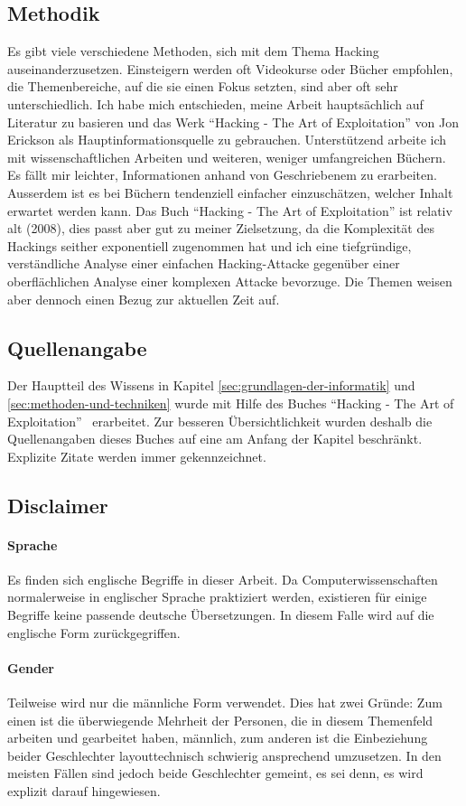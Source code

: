 \documentclass[11pt, a4paper]{article}
\begin{document}
\subsection{Methodik}
Es gibt viele verschiedene Methoden, sich mit dem Thema Hacking auseinanderzusetzen. Einsteigern werden oft Videokurse oder Bücher empfohlen, die Themenbereiche, auf die sie einen Fokus setzten, sind aber oft sehr unterschiedlich. Ich habe mich entschieden, meine Arbeit hauptsächlich auf Literatur zu basieren und das Werk ``Hacking - The Art of Exploitation'' von Jon Erickson als Hauptinformationsquelle zu gebrauchen. Unterstützend arbeite ich mit wissenschaftlichen Arbeiten und weiteren, weniger umfangreichen Büchern. Es fällt mir leichter, Informationen anhand von Geschriebenem zu erarbeiten. Ausserdem ist es bei Büchern tendenziell einfacher einzuschätzen, welcher Inhalt erwartet werden kann. Das Buch ``Hacking - The Art of Exploitation'' ist relativ alt (2008), dies passt aber gut zu meiner Zielsetzung, da die Komplexität des Hackings seither exponentiell zugenommen hat und ich eine tiefgründige, verständliche Analyse einer einfachen Hacking-Attacke gegenüber einer oberflächlichen Analyse einer komplexen Attacke bevorzuge. Die Themen weisen aber dennoch einen Bezug zur aktuellen Zeit auf.

\subsection*{Quellenangabe}
Der Hauptteil des Wissens in Kapitel \ref{sec:grundlagen-der-informatik} und \ref{sec:methoden-und-techniken} wurde mit Hilfe des Buches ``Hacking - The Art of Exploitation''~\cite{erickson2008hacking} erarbeitet. Zur besseren Übersichtlichkeit wurden deshalb die Quellenangaben dieses Buches auf eine am Anfang der Kapitel beschränkt. Explizite Zitate werden immer gekennzeichnet.

\subsection*{Disclaimer}
\paragraph{Sprache}
Es finden sich englische Begriffe in dieser Arbeit. Da Computerwissenschaften normalerweise in englischer Sprache praktiziert werden, existieren für einige Begriffe keine passende deutsche Übersetzungen. In diesem Falle wird auf die englische Form zurückgegriffen.
\paragraph{Gender}
Teilweise wird nur die männliche Form verwendet. Dies hat zwei Gründe: Zum einen ist die überwiegende Mehrheit der Personen, die in diesem Themenfeld arbeiten und gearbeitet haben, männlich, zum anderen ist die Einbeziehung beider Geschlechter layouttechnisch schwierig ansprechend umzusetzen. In den meisten Fällen sind jedoch beide Geschlechter gemeint, es sei denn, es wird explizit darauf hingewiesen.
\end{document}
